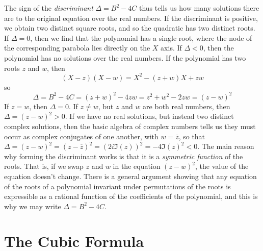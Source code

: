 The sign of the {\it discriminant} $\Delta = B^2 - 4C$ thus tells us how many solutions there are to the original equation over the real numbers. If the discriminant is positive, we obtain two distinct square roots, and so the quadratic has two distinct roots. If $\Delta = 0$, then we find that the polynomial has a single root, where the node of the corresponding parabola lies directly on the $X$ axis. If $\Delta < 0$, then the polynomial has no solutions over the real numbers. If the polynomial has two roots $z$ and $w$, then
%
\[ (X - z)(X - w) = X^2 - (z + w)X + zw \]
%
so
%
\[ \Delta = B^2 - 4C = (z + w)^2 - 4zw = z^2 + w^2 - 2zw = (z - w)^2 \]
%
If $z = w$, then $\Delta = 0$. If $z \neq w$, but $z$ and $w$ are both real numbers, then $\Delta = (z - w)^2 > 0$. If we have no real solutions, but instead two distinct complex solutions, then the basic algebra of complex numbers tells us they must occur as complex conjugates of one another, with $w = \overline{z}$, so that $\Delta = (z - w)^2 = (z - \overline{z})^2 = (2 i \Im(z))^2 = -4 \Im(z)^2 < 0$. The main reason why forming the discriminant works is that it is a {\it symmetric function} of the roots. That is, if we swap $z$ and $w$ in the equation $(z - w)^2$, the value of the equation doesn't change. There is a general argument showing that any equation of the roots of a polynomial invariant under permutations of the roots is expressible as a rational function of the coefficients of the polynomial, and this is why we may write $\Delta = B^2 - 4C$.

\section{The Cubic Formula}

